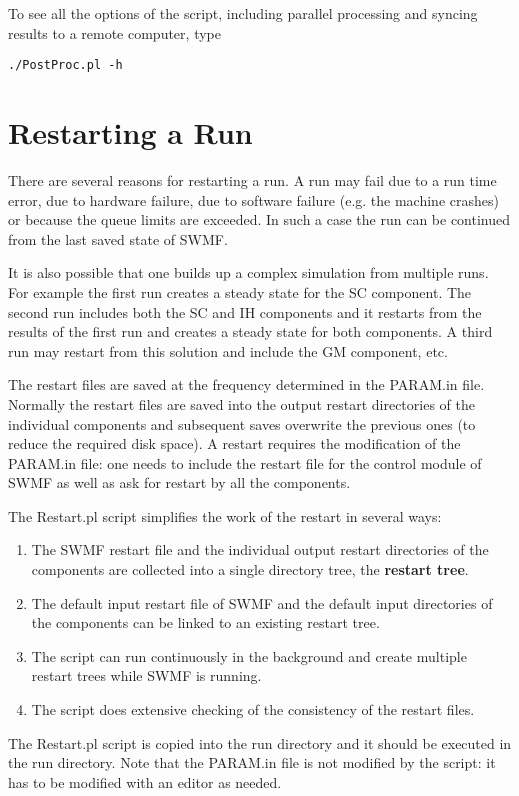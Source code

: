 To see all the options of the script, including parallel processing and
syncing results to a remote computer, type
\begin{verbatim}
./PostProc.pl -h
\end{verbatim}

\section{Restarting a Run}

There are several reasons for restarting a run. A run may fail
due to a run time error, due to hardware failure, due to 
software failure (e.g. the machine crashes) or because the
queue limits are exceeded. In such a case the run can be continued from
the last saved state of SWMF. 

It is also possible that one builds up a complex simulation from multiple 
runs. For example the first run creates a steady state for the SC component.
The second run includes both the SC and IH components and it 
restarts from the results of the first run and creates a steady state
for both components. A third run may restart from this solution and include
the GM component, etc. 

The restart files are saved at the frequency determined in the PARAM.in file.
Normally the restart files are saved into the output restart directories
of the individual components and subsequent saves overwrite the previous ones
(to reduce the required disk space). A restart requires the modification
of the PARAM.in file: one needs to include the restart file for the
control module of SWMF as well as ask for restart by all the components.

The Restart.pl script simplifies the work of the restart in several ways:
\begin{enumerate}
\item The SWMF restart file and the individual output restart 
directories of the components are collected into a single directory tree, 
the {\bf restart tree}.
\item The default input restart file of SWMF and the default 
      input directories of the components can be linked to an existing
      restart tree.
\item The script can run continuously in the background and create
      multiple restart trees while SWMF is running. 
\item The script does extensive checking of the consistency 
      of the restart files.
\end{enumerate}
The Restart.pl script is copied into the run directory and it should
be executed in the run directory. Note that the PARAM.in file is not
modified by the script: it has to be modified with an editor as needed.

